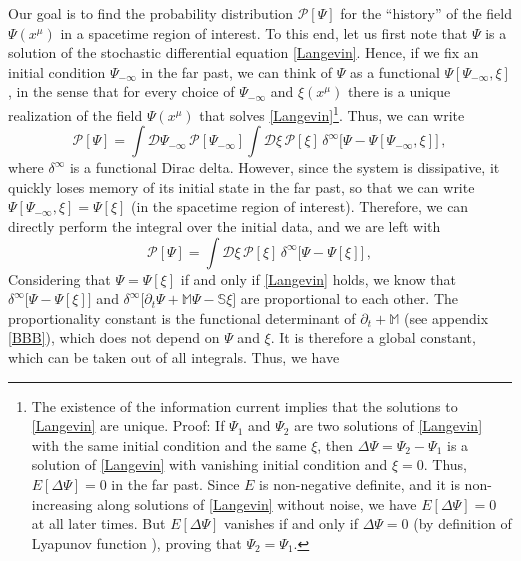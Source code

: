 \documentclass[a4paper, amsfonts, amssymb, amsmath, reprint, showkeys, nofootinbib, twoside,notitlepage,onecolumn]{revtex4-2}
\newcommand{\Ma}{{\mathbb{M}}}
\newcommand{\Sa}{{\mathbb{S}}}
\theoremstyle{definition}
\begin{document}
Our goal is to find the probability distribution $\mathcal{P}[\Psi]$ for the ``history'' of the field $\Psi(x^\mu)$ in a spacetime region of interest. To this end, let us first note that $\Psi$ is a solution of the stochastic differential equation \eqref{Langevin}.
Hence, if we fix an initial condition $\Psi_{-\infty}$ in the far past, we can think of $\Psi$ as a functional $\Psi[\Psi_{-\infty},\xi]$, in the sense that for every choice of $\Psi_{-\infty}$ and $\xi(x^\mu)$ there is a unique realization of the field $\Psi(x^\mu)$ that solves \eqref{Langevin}\footnote{The existence of the information current implies that the solutions to \eqref{Langevin} are unique. Proof: If $\Psi_1$ and $\Psi_2$ are two solutions of \eqref{Langevin} with the same initial condition and the same $\xi$, then $\Delta \Psi=\Psi_2{-}\Psi_1$ is a solution of \eqref{Langevin} with vanishing initial condition and $\xi=0$. Thus, $E[\Delta \Psi]{=}0$ in the far past. Since $E$ is non-negative definite, and it is non-increasing along solutions of \eqref{Langevin} without noise, we have $E[\Delta \Psi]{=}0$ at all later times. But $E[\Delta \Psi]$ vanishes if and only if $\Delta \Psi{=}0$ (by definition of Lyapunov function \cite{lasalle1961stability}), proving that $\Psi_2=\Psi_1$.}. Thus, we can write
\begin{equation}
    \mathcal{P}[\Psi]= \int \mathcal{D} \Psi_{-\infty} \, \mathcal{P}[\Psi_{-\infty}] \int \mathcal{D}\xi \,   \mathcal{P}[\xi] \, \delta^{\infty}\big[\Psi-\Psi[\Psi_{-\infty},\xi]\big] \, ,
\end{equation}
where $\delta^{\infty}$ is a functional Dirac delta. However, since the system is dissipative, it quickly loses memory of its initial state in the far past, so that we can write $\Psi[\Psi_{-\infty},\xi]=\Psi[\xi]$ (in the spacetime region of interest). Therefore, we can directly perform the integral over the initial data, and we are left with
\begin{equation}\label{veciopreston}
    \mathcal{P}[\Psi]=  \int \mathcal{D}\xi \,   \mathcal{P}[\xi] \, \delta^{\infty}\big[\Psi-\Psi[\xi]\big] \, ,
\end{equation}
Considering that $\Psi=\Psi[\xi]$ if and only if \eqref{Langevin} holds, we know that $\delta^{\infty}\big[\Psi-\Psi[\xi]\big]$ and $\delta^{\infty}\big[\partial_t \Psi {+}\Ma\Psi {-}\Sa\xi\big]$ are proportional to each other. The proportionality constant is the functional determinant of $\partial_t{+}\Ma$  (see appendix \ref{BBB}), which does not depend on $\Psi$ and $\xi$. It is therefore a global constant, which can be taken out of all integrals. Thus, we have
\end{document}
